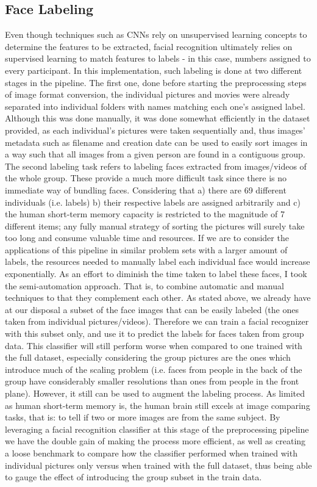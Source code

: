 \documentclass[11pt]{article}
\begin{document}
\subsection{Face Labeling}
    Even though techniques such as CNNs rely on unsupervised learning concepts to determine the features to be extracted, facial recognition ultimately relies on supervised learning to match features to labels - in this case, numbers assigned to every participant. In this implementation, such labeling is done at two different stages in the pipeline. The first one, done before starting the preprocessing steps of image format conversion, the individual pictures and movies were already separated into individual folders with names matching each one's assigned label. Although this was done manually, it was done somewhat efficiently in the dataset provided, as each individual's pictures were taken sequentially and, thus images' metadata such as filename and creation date can be used to easily sort images in a way such that all images from a given person are found in a contiguous group. The second labeling task refers to labeling faces extracted from images/videos of the whole group. These provide a much more difficult task since there is no immediate way of bundling faces. Considering that a) there are 69 different individuals (i.e. labels) b) their respective labels are assigned arbitrarily and c) the human short-term memory capacity is restricted to the magnitude of 7 different items; any fully manual strategy of sorting the pictures will surely take too long and consume valuable time and resources. If we are to consider the applications of this pipeline in similar problem sets with a larger amount of labels, the resources needed to manually label each individual face would increase exponentially. As an effort to diminish the time taken to label these faces, I took the semi-automation approach. That is, to combine automatic and manual techniques to that they complement each other.
    As stated above, we already have at our disposal a subset of the face images that can be easily labeled (the ones taken from individual pictures/videos). Therefore we can train a facial recognizer with this subset only, and use it to predict the labels for faces taken from group data. This classifier will still perform worse when compared to one trained with the full dataset, especially considering the group pictures are the ones which introduce much of the scaling problem (i.e. faces from people in the back of the group have considerably smaller resolutions than ones from people in the front plane). However, it still can be used to augment the labeling process. As limited as human short-term memory is, the human brain still excels at image comparing tasks, that is: to tell if two or more images are from the same subject. By leveraging a facial recognition classifier at this stage of the preprocessing pipeline we have the double gain of making the process more efficient, as well as creating a loose benchmark to compare how the classifier performed when trained with individual pictures only versus when trained with the full dataset, thus being able to gauge the effect of introducing the group subset in the train data.
\end{document}
